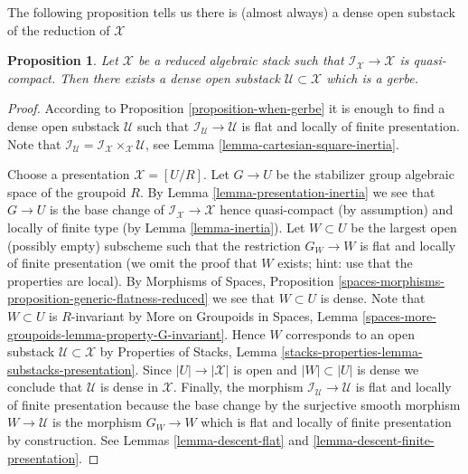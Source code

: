 \documentclass{stacks-project}
\theoremstyle{plain}
\newtheorem{proposition}[subsection]{Proposition}
\theoremstyle{definition}
\theoremstyle{remark}
\numberwithin{equation}{subsection}
\begin{document}
\medskip\noindent
The following proposition tells us there is (almost always) a dense
open substack of the reduction of $\mathcal{X}$

\begin{proposition}
\label{proposition-open-stratum}
Let $\mathcal{X}$ be a reduced algebraic stack such that
$\mathcal{I}_\mathcal{X} \to \mathcal{X}$ is quasi-compact.
Then there exists a dense open substack $\mathcal{U} \subset \mathcal{X}$
which is a gerbe.
\end{proposition}

\begin{proof}
According to
Proposition \ref{proposition-when-gerbe}
it is enough to find a dense open substack $\mathcal{U}$ such that
$\mathcal{I}_\mathcal{U} \to \mathcal{U}$ is flat and locally of finite
presentation. Note that
$\mathcal{I}_\mathcal{U} =
\mathcal{I}_\mathcal{X} \times_\mathcal{X} \mathcal{U}$, see
Lemma \ref{lemma-cartesian-square-inertia}.

\medskip\noindent
Choose a presentation $\mathcal{X} = [U/R]$. Let $G \to U$ be the stabilizer
group algebraic space of the groupoid $R$. By
Lemma \ref{lemma-presentation-inertia}
we see that $G \to U$ is the base change of
$\mathcal{I}_\mathcal{X} \to \mathcal{X}$ hence quasi-compact (by assumption)
and locally of finite type (by
Lemma \ref{lemma-inertia}).
Let $W \subset U$ be the largest open (possibly empty) subscheme such that
the restriction $G_W \to W$ is flat and locally of finite presentation
(we omit the proof that $W$ exists; hint: use that the properties are local).
By
Morphisms of Spaces, Proposition
\ref{spaces-morphisms-proposition-generic-flatness-reduced}
we see that $W \subset U$ is dense. Note that $W \subset U$ is $R$-invariant
by
More on Groupoids in Spaces, Lemma
\ref{spaces-more-groupoids-lemma-property-G-invariant}.
Hence $W$ corresponds to an open substack $\mathcal{U} \subset \mathcal{X}$ by
Properties of Stacks, Lemma
\ref{stacks-properties-lemma-substacks-presentation}.
Since $|U| \to |\mathcal{X}|$ is open and $|W| \subset |U|$ is dense we
conclude that $\mathcal{U}$ is dense in $\mathcal{X}$.
Finally, the morphism $\mathcal{I}_\mathcal{U} \to \mathcal{U}$
is flat and locally of finite presentation because the base change by
the surjective smooth morphism $W \to \mathcal{U}$ is the morphism
$G_W \to W$ which is flat and locally of finite presentation by construction.
See
Lemmas \ref{lemma-descent-flat} and
\ref{lemma-descent-finite-presentation}.
\end{proof}
\end{document}
